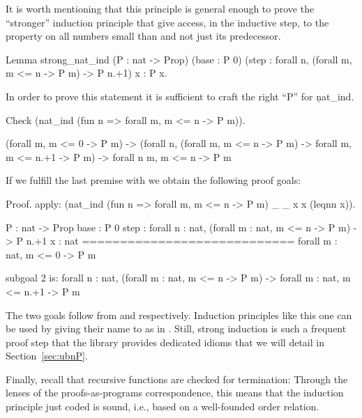 It is worth mentioning that this principle is general enough to
prove the ``stronger'' induction principle that give access, in
the inductive step, to the property  on all numbers
small than  and not just its predecessor.

\begin{coq}{}{}
Lemma strong_nat_ind (P : nat -> Prop)
  (base : P 0)
  (step : forall n, (forall m, m <= n -> P m) -> P n.+1) x : P x.
\end{coq}{}{}

In order to prove this statement it is sufficient to craft
the right ``P'' for \c{nat_ind}.

\begin{coq}{}{}
Check (nat_ind (fun n => forall m, m <= n -> P m)).
\end{coq}{}{}
\begin{coqout}{}{}
  (forall m, m <= 0 -> P m) ->
  (forall n, (forall m, m <= n -> P m) -> forall m, m <= n.+1 -> P m) ->
  forall n m, m <= n -> P m
\end{coqout}{}{}

If we fulfill the last premise with  we obtain
the following proof goals:

\begin{coq}{}{}
Proof.
apply: (nat_ind (fun n => forall m, m <= n -> P m) _ _ x x (leqnn x)).
\end{coq}{}{}
\begin{coqout}{}{}
  P : nat -> Prop
  base : P 0
  step : forall n : nat, (forall m : nat, m <= n -> P m) -> P n.+1
  x : nat
  ============================
  forall m : nat, m <= 0 -> P m

subgoal 2 is:
 forall n : nat,
 (forall m : nat, m <= n -> P m) -> forall m : nat, m <= n.+1 -> P m
\end{coqout}{}{}

The two goals follow from  and  respectively.
Induction principles like this one can be used by giving their name to  as in
. Still, strong induction is such a frequent
proof step that the \mcbMC{} library provides dedicated idioms
that we will detail in Section~\ref{sec:ubnP}.

Finally, recall that recursive functions are checked for termination:
Through the lenses of the proofs-as-programs correspondence, this means
that the induction principle just coded is sound, i.e., based on a
well-founded order relation.

